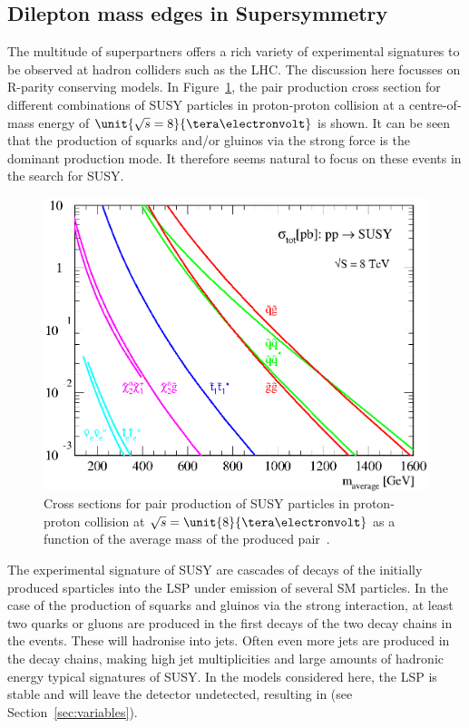 \subsection{Dilepton mass edges in Supersymmetry}
\label{sec:edges}
The multitude of superpartners offers a rich variety of experimental signatures to be observed at hadron colliders such as the LHC. The discussion here focusses on R-parity conserving models. In Figure~\ref{fig:SUSYXSecs}, the pair production cross section for different combinations of SUSY particles in proton-proton collision at a centre-of-mass energy of $\unit{\sqrt{s}=8}{\tera\electronvolt}$ is shown. It can be seen that the production of squarks and/or gluinos via the strong force is the dominant production mode. It therefore seems natural to focus on these events in the search for SUSY.
\begin{figure}
\centering
\includegraphics[scale=0.6]{plots/THEO/prospino_lhc8.eps}
\caption{Cross sections for pair production of SUSY particles in proton-proton collision at $\sqrt{s} = \unit{8}{\tera\electronvolt}$ as a function of the average mass of the produced pair~\cite{ProspinoPlot,Beenakker:1999xh,Beenakker:1997ut,bib-nlo-nll-01}.}
\label{fig:SUSYXSecs}
\end{figure}

The experimental signature of SUSY are cascades of decays of the initially produced sparticles into the LSP under emission of several SM particles. In the case of the production of squarks and gluinos via the strong interaction, at least two quarks or gluons are produced in the first decays of the two decay chains in the events. These will hadronise into jets. Often even more jets are produced in the decay chains, making high jet multiplicities and large amounts of hadronic energy typical signatures of SUSY. In the models considered here, the LSP is stable and will leave the detector undetected, resulting in \MET (see Section~\ref{sec:variables}).

